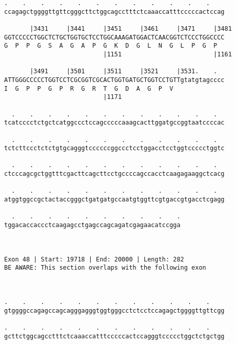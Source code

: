 \documentclass{article}
\begin{document}
\begin{Verbatim}
.    .    .    .    .    .    .    .    .    .    .    .    
ccagagctggggttgttcgggcttctggcagcctttctcaaaccatttcccccactccag
                                                            
       |3431     |3441     |3451     |3461     |3471     |3481
GGTCCCCCTGGCTCTGCTGGTGCTCCTGGCAAAGATGGACTCAACGGTCTCCCTGGCCCC
G  P  P  G  S  A  G  A  P  G  K  D  G  L  N  G  L  P  G  P  
                           |1151                         |1161
  
       |3491     |3501     |3511     |3521     |3531.    .  
ATTGGGCCCCCTGGTCCTCGCGGTCGCACTGGTGATGCTGGTCCTGTTgtatgtagcccc
I  G  P  P  G  P  R  G  R  T  G  D  A  G  P  V              
                           |1171                            
  
  .    .    .    .    .    .    .    .    .    .    .    .  
tcatcccctctgctcatggccctccagcccccaaagcacttggatgccggtaatccccac
                                                            
  .    .    .    .    .    .    .    .    .    .    .    .  
tctcttccctctctgtgcagggtccccccggccctcctggacctcctggtccccctggtc
                                                            
  .    .    .    .    .    .    .    .    .    .    .    .  
ctcccagcgctggtttcgacttcagcttcctgccccagccacctcaagagaaggctcacg
                                                            
  .    .    .    .    .    .    .    .    .    .    .    .  
atggtggccgctactaccgggctgatgatgccaatgtggttcgtgaccgtgacctcgagg
                                                            
  .    .    .    .    .    .    .    .    .    .
tggacaccaccctcaagagcctgagccagcagatcgagaacatccgga
                                                
                                                
 
Exon 48 | Start: 19718 | End: 20000 | Length: 282
BE AWARE: This section overlaps with the following exon



.    .    .    .    .    .    .    .    .    .    .    .    
gtggggccagagccagcagggagggtggtgggcctctcctccagagctggggttgttcgg
                                                            
.    .    .    .    .    .    .    .    .    .    .    .    
gcttctggcagcctttctcaaaccatttcccccactccagggtccccctggctctgctgg
                                                            

\end{Verbatim}
\end{document}
